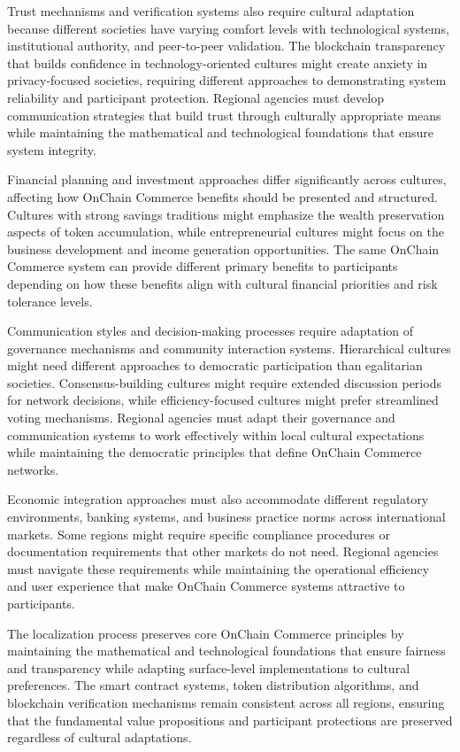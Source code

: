 \documentclass[
  Letterpaper,
]{scrbook}
\begin{document}
Trust mechanisms and verification systems also require cultural
adaptation because different societies have varying comfort levels with
technological systems, institutional authority, and peer-to-peer
validation. The blockchain transparency that builds confidence in
technology-oriented cultures might create anxiety in privacy-focused
societies, requiring different approaches to demonstrating system
reliability and participant protection. Regional agencies must develop
communication strategies that build trust through culturally appropriate
means while maintaining the mathematical and technological foundations
that ensure system integrity.

Financial planning and investment approaches differ significantly across
cultures, affecting how OnChain Commerce benefits should be presented
and structured. Cultures with strong savings traditions might emphasize
the wealth preservation aspects of token accumulation, while
entrepreneurial cultures might focus on the business development and
income generation opportunities. The same OnChain Commerce system can
provide different primary benefits to participants depending on how
these benefits align with cultural financial priorities and risk
tolerance levels.

Communication styles and decision-making processes require adaptation of
governance mechanisms and community interaction systems. Hierarchical
cultures might need different approaches to democratic participation
than egalitarian societies. Consensus-building cultures might require
extended discussion periods for network decisions, while
efficiency-focused cultures might prefer streamlined voting mechanisms.
Regional agencies must adapt their governance and communication systems
to work effectively within local cultural expectations while maintaining
the democratic principles that define OnChain Commerce networks.

Economic integration approaches must also accommodate different
regulatory environments, banking systems, and business practice norms
across international markets. Some regions might require specific
compliance procedures or documentation requirements that other markets
do not need. Regional agencies must navigate these requirements while
maintaining the operational efficiency and user experience that make
OnChain Commerce systems attractive to participants.

The localization process preserves core OnChain Commerce principles by
maintaining the mathematical and technological foundations that ensure
fairness and transparency while adapting surface-level implementations
to cultural preferences. The smart contract systems, token distribution
algorithms, and blockchain verification mechanisms remain consistent
across all regions, ensuring that the fundamental value propositions and
participant protections are preserved regardless of cultural
adaptations.
\end{document}
